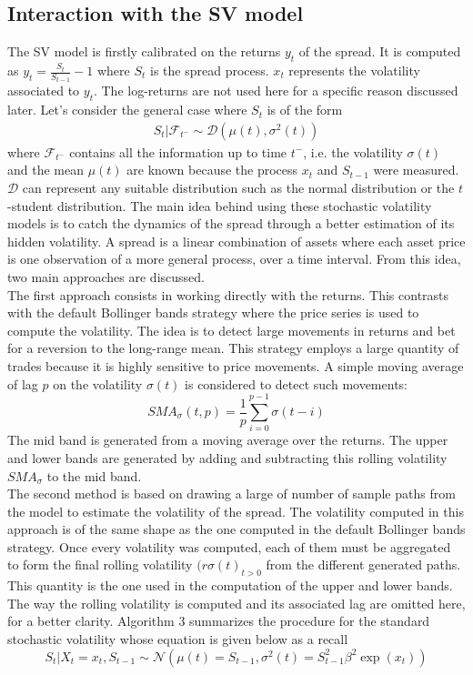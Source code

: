 \documentclass[11pt,a4,twosided,singlespacing,titlepagenumber=on]{scrreprt}
\numberwithin{equation}{chapter} %
\theoremstyle{remark}
\begin{document}
\subsection{Interaction with the SV model}

The SV model is firstly calibrated on the returns $y_t$ of the spread. It is computed as $y_t = \frac{S_t}{S_{t-1}}-1$ where $S_t$ is the spread process.
$x_t$ represents the volatility associated to $y_t$. The log-returns are not used here for a specific reason discussed later. Let's consider the general case where $S_t$ is of the form
\begin{align*}
S_t | \mathcal{F}_{t^-} \sim \mathcal{D}\left( \mu(t), \sigma^2(t) \right)
\end{align*}
where $\mathcal{F}_{t^-}$ contains all the information up to time $t^-$, i.e. the volatility $\sigma(t)$ and the mean $\mu(t)$ are known because the process $x_t$ and $S_{t-1}$ were measured. $\mathcal{D}$ can represent any suitable distribution such as the normal distribution or the $t$-student distribution.
The main idea behind using these stochastic volatility models is to catch the dynamics of the spread through a better estimation of its hidden volatility. A spread is a linear combination of assets where each asset price is one observation of a more general process, over a time interval. From this idea, two main approaches are discussed. \\

\noindent
The first approach consists in working directly with the returns. This contrasts with the default Bollinger bands strategy where the price series is used to compute the volatility. The idea is to detect large movements in returns and bet for a reversion to the long-range mean. This strategy employs a large quantity of trades because it is highly sensitive to price movements. A simple moving average of lag $p$ on the volatility $\sigma(t)$ is considered to detect such movements:
$$SMA_\sigma(t, p) = \frac{1}{p} \sum_{i=0}^{p-1}\sigma(t-i)$$
The mid band is generated from a moving average over the returns. The upper and lower bands are generated by adding and subtracting this rolling volatility $SMA_\sigma$ to the mid band. \\

\noindent
The second method is based on drawing a large of number of sample paths from the model to estimate the volatility of the spread. The volatility computed in this approach is of the same shape as the one computed in the default Bollinger bands strategy. Once every volatility was computed, each of them must be aggregated to form the final rolling volatility $(r\sigma(t)_{t>0}$ from the different generated paths. This quantity is the one used in the computation of the upper and lower bands. The way the rolling volatility is computed and its associated lag are omitted here, for a better clarity. Algorithm 3 summarizes the procedure for the standard stochastic volatility whose equation is given below as a recall
$$S_t | X_t = x_t, S_{t-1} \sim \mathcal{N}(\mu(t) = S_{t-1}, \sigma^2(t)= S_{t-1}^2 \beta^2 \exp(x_t))$$
\end{document}
